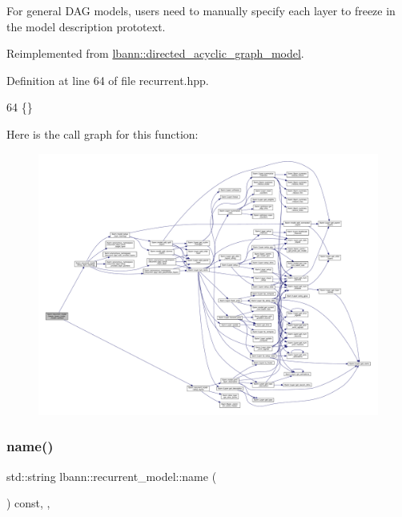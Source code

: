 For general D\+AG models, users need to manually specify each layer to freeze in the model description prototext. 

Reimplemented from \hyperlink{classlbann_1_1directed__acyclic__graph__model_a9f2a6e9472235ec91c5a50356471b3cb}{lbann\+::directed\+\_\+acyclic\+\_\+graph\+\_\+model}.



Definition at line 64 of file recurrent.\+hpp.


\begin{DoxyCode}
64 \{\}
\end{DoxyCode}
Here is the call graph for this function\+:\nopagebreak
\begin{figure}[H]
\begin{center}
\leavevmode
\includegraphics[width=350pt]{classlbann_1_1recurrent__model_aa4e43de8bf0d11a0f51dedbcf22a73cc_cgraph}
\end{center}
\end{figure}
\mbox{\label{classlbann_1_1recurrent__model_a01b4f6dce63bc2e0545b2bd7603b32b2}} 
\subsubsection{\texorpdfstring{name()}{name()}}
{\footnotesize\ttfamily std\+::string lbann\+::recurrent\+\_\+model\+::name (\begin{DoxyParamCaption}{ }\end{DoxyParamCaption}) const\hspace{0.3cm}{\ttfamily [inline]}, {\ttfamily [override]}, {\ttfamily [virtual]}}

